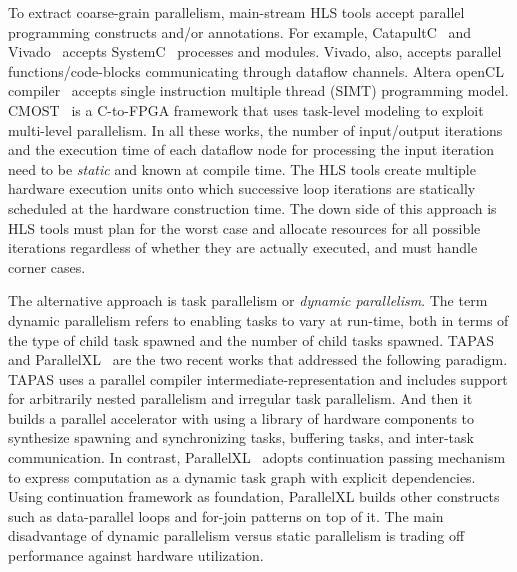 To extract coarse-grain parallelism, main-stream HLS tools accept parallel programming constructs and/or annotations.
For example, CatapultC~\cite{catapult} and Vivado~\cite{vivado} accepts SystemC~\cite{systemc} processes and modules.
Vivado, also, accepts parallel functions/code-blocks communicating through dataflow channels.
Altera openCL compiler~\cite{opencl_sdk} accepts single instruction multiple thread (SIMT) programming model. 
CMOST~\cite{zhang_DAC_2015_cmost} is a C-to-FPGA framework that uses task-level modeling to exploit multi-level parallelism.
In all these works, the number of input/output iterations and the execution time of each dataflow node for processing the input iteration need to be \emph{static} and known at compile time.
The HLS tools create multiple hardware execution units onto which successive loop iterations are statically scheduled at the hardware construction time.
The down side of this approach is HLS tools must plan for the worst case and allocate resources for all possible iterations regardless of whether they are actually executed, and must handle corner cases.

The alternative approach is task parallelism or \emph{dynamic parallelism}.
The term dynamic parallelism refers to enabling tasks to vary at run-time, both in terms of the type of child task spawned and the number of child tasks spawned.
TAPAS~\cite{margerm_2018_tapas} and ParallelXL~\cite{chen_micro_2018_parallelXL} are the two recent works that addressed the following paradigm.
TAPAS uses a parallel compiler intermediate-representation and includes support for arbitrarily nested parallelism and irregular task parallelism.
And then it builds a parallel accelerator with using a library of hardware components to synthesize spawning and synchronizing tasks, buffering tasks, and inter-task communication.
In contrast, ParallelXL~\cite{chen_micro_2018_parallelXL} adopts continuation passing mechanism to express computation as a dynamic task graph with explicit dependencies.
Using continuation framework as foundation, ParallelXL builds other constructs such as data-parallel loops and for-join patterns on top of it.
The main disadvantage of dynamic parallelism versus static parallelism is trading off performance against hardware utilization.

